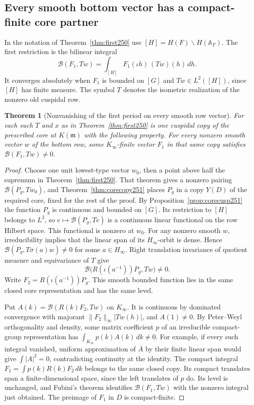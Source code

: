 \documentclass[a4paper,11pt]{article}
\newtheorem{theorem}[proposition]{Theorem}
\theoremstyle{definition}
\theoremstyle{remark}
\numberwithin{equation}{section}
\begin{document}
\subsection{Every smooth bottom vector has a compact-finite core partner}\label{nav:V-33}
In the notation of Theorem~\ref{thm:first250} use \([H]=H(F)\backslash
H(\mathbb A_F)\). The first restriction is the bilinear integral
\[
        \mathcal B(F_1,Tw)=\int_{[H]} F_1(\iota h)\,(Tw)(h)\,dh .
\]
It converges absolutely when \(F_1\) is bounded on \([G]\) and
\(Tw\in L^2([H])\), since \([H]\) has finite measure. The symbol
\(T\) denotes the isometric realization of the nonzero old cuspidal row.

\begin{theorem}[Nonvanishing of the first period on every smooth row vector]
\label{thm:allrows251}
For each such \(T\) and \(x\) as in Theorem~\ref{thm:first250} is
one cuspidal copy of the prescribed core at \(K(\mathfrak m)\) with the
following property. For every nonzero smooth vector \(w\) of the bottom
row, some \(K_\infty\)-finite vector \(F_1\) in that same copy satisfies
\(\mathcal B(F_1,Tw)\ne0\).
\end{theorem}
\begin{proof}
Choose one unit lowest-type vector \(w_0\), then a point above half the
supremum in Theorem~\ref{thm:first250}. That theorem gives a nonzero
pairing \(\mathcal B(P_g,Tw_0)\), and Theorem~\ref{thm:corecopy251}
places \(P_g\) in a copy \(Y(D)\) of the required core, fixed for the
rest of the proof. By Proposition~\ref{prop:corecusp251} the function
\(P_g\) is continuous and bounded on \([G]\). Its restriction to
\([H]\) belongs to \(L^2\), so \(e\mapsto\mathcal B(P_g,Te)\) is a
continuous linear functional on the row Hilbert space. This functional
is nonzero at \(w_0\). For any nonzero smooth \(w\), irreducibility
implies that the linear span of its \(H_\infty\)-orbit is dense.
Hence \(\mathcal B(P_g,T\sigma(a)w)\ne0\) for some \(a\in H_\infty\).
Right translation invariance of quotient measure and equivariance of
\(T\) give
\[
       \mathcal B\big(R(\iota(a^{-1}))P_g,Tw\big)\ne0 .
\]
Write \(F_2=R(\iota(a^{-1}))P_g\). This smooth bounded function
lies in the same closed core representation and has the same level.

Put \(A(k)=\mathcal B(R(k)F_2,Tw)\) on \(K_\infty\). It is continuous
by dominated convergence with majorant \(\|F_2\|_\infty |Tw(h)|\),
and \(A(1)\ne0\). By Peter--Weyl orthogonality and density, some
matrix coefficient \(p\) of an irreducible compact-group representation
has \(\int_{K_\infty}p(k)A(k)\,dk\ne0\). For example, if every such
integral vanished, uniform approximation of \(\overline{A}\) by their
finite linear span would give \(\int |A|^2=0\), contradicting
continuity at the identity. The compact integral
\(F_1=\int p(k)R(k)F_2\,dk\) belongs to the same closed copy.
Its compact translates span a finite-dimensional space, since the
left translates of \(p\) do. Its level is unchanged, and Fubini's
theorem identifies \(\mathcal B(F_1,Tw)\) with the nonzero integral
just obtained. The preimage of \(F_1\) in \(D\) is compact-finite.
\end{proof}
\end{document}
